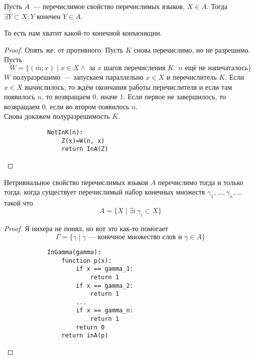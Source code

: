 \documentclass{article}
\begin{document}
    \begin{lemma}
        Пусть $A$~--- перечислимое свойство перечислимых языков, $X\in A$. Тогда $\exists Y\subset X:Y$ конечен $Y\in A$.
    \end{lemma}
    \begin{remark}
        То есть нам хватит какой-то конечной конъюнкции.
    \end{remark}
    \begin{proof}
        Опять же, от противного. Пусть $K$ снова перечислимо, но не разрешимо. Пусть $$W=\{(m;x)\mid x\in X\land\text{ за }x\text{ шагов перечисления }K\text{ }n\text{ ещё не напечаталось}\}$$
        $W$ полуразрешимо~--- запускаем параллельно $x\in X$ и перечислитель $K$. Если $x\in X$ вычислилось, то ждём окончания работы перечислителя и если там появилось $n$, то возвращаем 0, иначе 1. Если первое не завершилось, то возвращаем 0, если во втором появилось $n$.\\
        Снова докажем полуразрешимость $\overline K$.
        \begin{verbatim}
            NotInK(n):
                Z(x)=W(n, x)
                return InA(Z)
        \end{verbatim}
    \end{proof}
    \begin{theorem}
        Нетривиальное свойство перечислимых языков $A$ перечислимо тогда и только тогда, когда существует перечислимый набор конечных множеств $\gamma_1,\ldots,\gamma_n,\ldots$ такой что
        $$
        A=\{X\mid \exists i~\gamma_i\subset X\}
        $$
    \end{theorem}
    \begin{proof}
        Я нихера не понял, но вот это как-то помогает
        $$\Gamma=\{\gamma\mid\gamma\text{~--- конечное множество слов и }\gamma\in A\}$$
        \begin{verbatim}
            InGamma(gamma):
                function p(x):
                    if x == gamma_1:
                        return 1
                    if x == gamma_2:
                        return 1
                    ...
                    if x == gamma_n:
                        return 1
                    return 0
                return inA(p)
        \end{verbatim}
    \end{proof}
\end{document}
